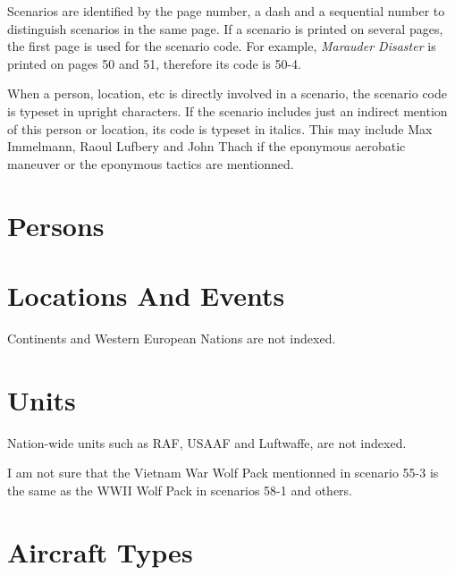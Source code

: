 \documentclass[a4paper,twocolumn]{article}
\begin{document}
Scenarios are identified by the page number, a dash and a
sequential number to distinguish scenarios in the same page. If
a scenario is printed on several pages, the first page is used for
the scenario code. For example, \textit{Marauder Disaster} is printed
on pages 50 and 51, therefore its code is 50-4.

When a person, location, etc is directly involved in a scenario,
the scenario code is typeset in upright characters. If the scenario
includes just an indirect mention of this person or location,
its code is typeset in italics. This may include Max Immelmann, Raoul Lufbery
and John Thach if the eponymous aerobatic maneuver or the eponymous
tactics are mentionned.


\section*{Persons}

\vspace{1mm}


\section*{Locations And Events}

Continents and Western European Nations are not indexed.

\vspace{1mm}


\section*{Units}

Nation-wide units such as RAF, USAAF and Luftwaffe, are not indexed.

\vspace{1mm}


\vspace{1mm}

I am not sure that the Vietnam War Wolf Pack mentionned in
scenario 55-3 is the same as the WWII Wolf Pack in
scenarios 58-1 and others.

\section*{Aircraft Types}
\end{document}
